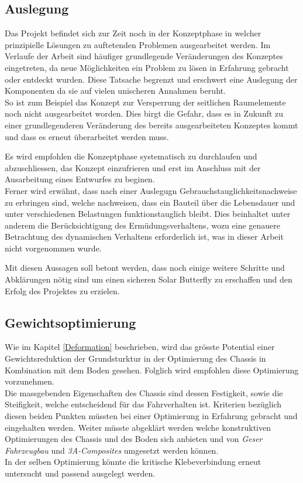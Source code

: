 \subsection{Auslegung}
Das Projekt befindet sich zur Zeit noch in der Konzeptphase in welcher prinzipielle Lösungen zu auftetenden Problemen ausgearbeitet werden. Im Verlaufe der Arbeit sind häufiger grundlegende Veränderungen des Konzeptes eingetreten, da neue Möglichkeiten ein Problem zu lösen in Erfahrung gebracht oder entdeckt wurden. Diese Tatsache begrenzt und erschwert eine Auslegung der Komponenten da sie auf vielen unischeren Annahmen beruht.\\
So ist zum Beispiel das Konzept zur Versperrung der seitlichen Raumelemente noch nicht ausgearbeitet worden. Dies birgt die Gefahr, dass es in Zukunft zu einer grundlegenderen Veränderung des bereits ausgearbeiteten Konzeptes kommt und dass es erneut überarbeitet werden muss.

Es wird empfohlen die Konzeptphase systematisch zu durchlaufen und abzuschliessen, das Konzept einzufrieren und erst im Anschluss mit der Ausarbeitung eines Entwurfes zu beginen.\\

Ferner wird erwähnt, dass nach einer Auslegugn Gebrauchstauglichkeitsnachweise zu erbringen sind, welche nachweisen, dass ein Bauteil über die Lebensdauer und unter verschiedenen Belastungen funktionstauglich bleibt. Dies beinhaltet unter anderem die Berücksichtigung des Ermüdungsverhaltens, wozu eine genauere Betrachtung des dynamischen Verhaltens erforderlich ist, was in dieser Arbeit nicht vorgenommen wurde.

Mit diesen Aussagen soll betont werden, dass noch einige weitere Schritte und Abklärungen nötig sind um einen sicheren Solar Butterfly zu erschaffen und den Erfolg des Projektes zu erzielen.


\subsection{Gewichtsoptimierung}
Wie im Kapitel \ref{Deformation} beschrieben, wird das grösste Potential einer Gewichtsreduktion der Grundsturktur in der Optimierung des Chassis in Kombination mit dem Boden gesehen. Folglich wird empfohlen diese Optimierung vorzunehmen.\\
Die massgebenden Eigenschaften des Chassis sind dessen Festigkeit, sowie die Steifigkeit, welche entscheidend für das Fahrverhalten ist. Kriterien bezüglich diesen beiden Punkten müssten bei einer Optimierung in Erfahrung gebracht und eingehalten werden. Weiter müsste abgeklärt werden welche konstruktiven Optimierungen des Chassis und des Boden sich anbieten und von \emph{Geser Fahrzeugbau} und \emph{3A-Composites} umgesetzt werden können.\\
In der selben Optimierung könnte die kritische Klebeverbindung erneut untersucht und passend ausgelegt werden.

